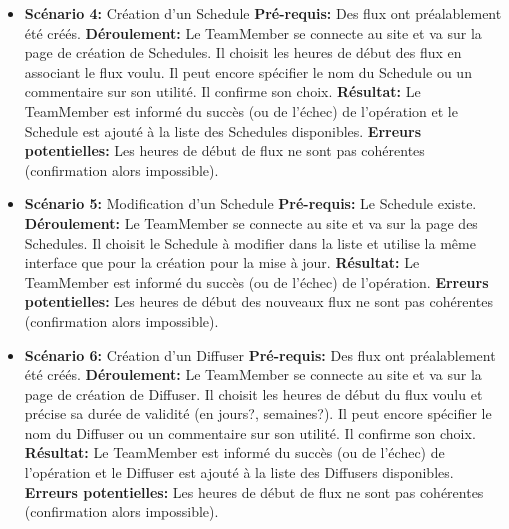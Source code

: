 \documentclass[french]{article}
\begin{document}
\begin{itemize}
			\item \textbf{Scénario 4:} Création d'un Schedule\newline
			\textbf{Pré-requis:} Des flux ont préalablement été créés.\newline
			\textbf{Déroulement:} Le TeamMember se connecte au site et va sur la page de création de Schedules. Il choisit les heures de début des flux en associant le flux voulu. Il peut encore spécifier le nom du Schedule ou un commentaire sur son utilité. Il confirme son choix. \newline
			\textbf{Résultat:} Le TeamMember est informé du succès (ou de l'échec) de l'opération et le Schedule est ajouté à la liste des Schedules disponibles.\newline
			\textbf{Erreurs potentielles:} Les heures de début de flux ne sont pas cohérentes (confirmation alors impossible). \newline
			
			\item \textbf{Scénario 5:} Modification d'un Schedule \newline
			\textbf{Pré-requis:} Le Schedule existe.\newline
			\textbf{Déroulement:} Le TeamMember se connecte au site et va sur la page des Schedules. Il choisit le Schedule à modifier dans la liste et utilise la même interface que pour la création pour la mise à jour. \newline
			\textbf{Résultat:} Le TeamMember est informé du succès (ou de l'échec) de l'opération.\newline
			\textbf{Erreurs potentielles:} Les heures de début des nouveaux flux ne sont pas cohérentes (confirmation alors impossible). \newline
			
			\item \textbf{Scénario 6:} Création d'un Diffuser\newline
			\textbf{Pré-requis:} Des flux ont préalablement été créés.\newline
			\textbf{Déroulement:} Le TeamMember se connecte au site et va sur la page de création de Diffuser. Il choisit les heures de début du flux voulu et précise sa durée de validité (en jours?, semaines?). Il peut encore spécifier le nom du Diffuser ou un commentaire sur son utilité. Il confirme son choix. \newline
			\textbf{Résultat:} Le TeamMember est informé du succès (ou de l'échec) de l'opération et le Diffuser est ajouté à la liste des Diffusers disponibles.\newline
			\textbf{Erreurs potentielles:} Les heures de début de flux ne sont pas cohérentes (confirmation alors impossible). \newline
			

\end{itemize}
\end{document}
